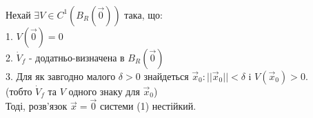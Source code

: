 \begin{boxteo} \ \\Нехай $\exists V \in C^{1} (B_R (\overrightarrow{0}))$ така, що:\\
1. $V(\overrightarrow{0}) = 0$\\
2. $\dot{V}_f $ - додатньо-визначена в $B_R (\overrightarrow{0})$\\
3. Для як завгодно малого $\delta > 0 $ знайдеться $\overrightarrow{x}_0 : ||\overrightarrow{x}_0|| < \delta $ i $V (\overrightarrow{x}_0) > 0 $. \\
(тобто $\dot{V}_f$ та $V$ одного знаку для $\overrightarrow{x}_0$)\\
Тоді, розв'язок $\overrightarrow{x} = \overrightarrow{0} $ системи (1) нестійкий.

\end{boxteo}
